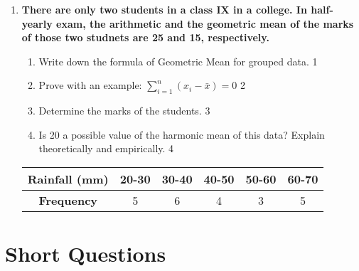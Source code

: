 \documentclass[a4paper,oneside]{book}
\begin{document}
\begin{enumerate}
     \item
	  \textbf{There are only two students in a class IX in a college. In half-yearly exam, the arithmetic and the geometric mean of the marks of those two studnets are 25 and 15, respectively.} 
  
  \begin{enumerate}
    \item
	Write down the formula of Geometric Mean for grouped data. \hfill 1
	\item Prove with an example: $\displaystyle \sum_{i=1}^n (x_i-\bar x) = 0$ \hfill 2
    \item  
	Determine the marks of the students. \hfill 3
    \item
	Is 20 a possible value of the harmonic mean of this data? Explain theoretically and empirically. \hfill 4
  \end{enumerate}

\begin{table}[h]
\centering
\begin{tabular}{c|c|c|c|c|c}
\textbf{Rainfall (mm)} & 20-30 & 30-40 & 40-50 & 50-60 & 60-70 \\ \hline
\textbf{Frequency} & 5 & 6 & 4 & 3 & 5
\end{tabular}
\end{table}
\end{enumerate}

\section{Short Questions}
\end{document}
